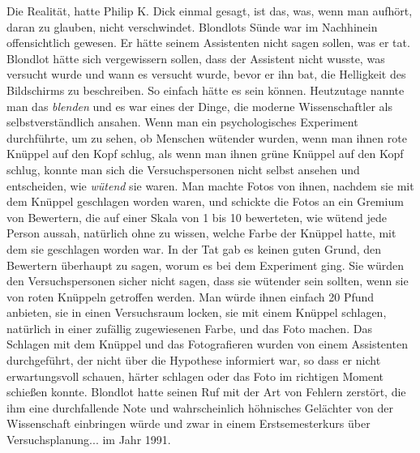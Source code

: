 Die Realität, hatte Philip K. Dick einmal gesagt, ist das, was, wenn man
aufhört, daran zu glauben, nicht verschwindet. Blondlots Sünde war im Nachhinein
offensichtlich gewesen. Er hätte seinem Assistenten nicht sagen sollen, was er
tat. Blondlot hätte sich vergewissern sollen, dass der Assistent nicht wusste,
was versucht wurde und wann es versucht wurde, bevor er ihn bat, die Helligkeit
des Bildschirms zu beschreiben. So einfach hätte es sein können. Heutzutage
nannte man das \glqq \emph{blenden}\grqq{} und es war eines der Dinge, die
moderne Wissenschaftler als selbstverständlich ansahen. Wenn man ein
psychologisches Experiment durchführte, um zu sehen, ob Menschen wütender
wurden, wenn man ihnen rote Knüppel auf den Kopf schlug, als wenn man ihnen
grüne Knüppel auf den Kopf schlug, konnte man sich die Versuchspersonen nicht
selbst ansehen und entscheiden, wie \glqq \emph{wütend}\grqq{} sie waren. Man
machte Fotos von ihnen, nachdem sie mit dem Knüppel geschlagen worden waren, und
schickte die Fotos an ein Gremium von Bewertern, die auf einer Skala von 1 bis
10 bewerteten, wie wütend jede Person aussah, natürlich ohne zu wissen, welche
Farbe der Knüppel hatte, mit dem sie geschlagen worden war. In der Tat gab es
keinen guten Grund, den Bewertern überhaupt zu sagen, worum es bei dem
Experiment ging. Sie würden den Versuchspersonen sicher nicht sagen, dass sie
wütender sein sollten, wenn sie von roten Knüppeln getroffen werden. Man würde
ihnen einfach 20 Pfund anbieten, sie in einen Versuchsraum locken, sie mit einem
Knüppel schlagen, natürlich in einer zufällig zugewiesenen Farbe, und das Foto
machen. Das Schlagen mit dem Knüppel und das Fotografieren wurden von einem
Assistenten durchgeführt, der nicht über die Hypothese informiert war, so dass
er nicht erwartungsvoll schauen, härter schlagen oder das Foto im richtigen
Moment schießen konnte. Blondlot hatte seinen Ruf mit der Art von Fehlern
zerstört, die ihm eine durchfallende Note und wahrscheinlich höhnisches
Gelächter von der Wissenschaft einbringen würde und zwar in einem
Erstsemesterkurs über Versuchsplanung... im Jahr 1991.

